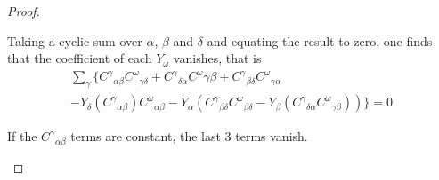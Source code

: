 \begin{proof}
\begin{enumerate}[label=(\alph*)]
    Taking a cyclic sum over $\alpha$, $\beta$ and $\delta$ and equating the result to zero, one finds that the coefficient of each $Y_\omega$ vanishes, that is
    \begin{multline}
        \sum_\gamma\big\{{C^\gamma}_{\alpha\beta}{C^\omega}_{\gamma\delta}+{C^\gamma}_{\delta\alpha}{C^\omega}{\gamma\beta}+{C^\gamma}_{\beta\delta}{C^\omega}_{\gamma\alpha}\\
        -Y_\delta({C^\gamma}_{\alpha\beta}){C^\omega}_{\alpha\beta}-Y_\alpha({C^\gamma}_{\beta\delta}{C^\omega}_{\beta\delta}-Y_\beta({C^\gamma}_{\delta\alpha}{C^\omega}_{\gamma\beta}))\big\}=0
    \end{multline}

    If the ${C^\gamma}_{\alpha\beta}$ terms are constant, the last $3$ terms vanish.
\end{enumerate}
\end{proof}

